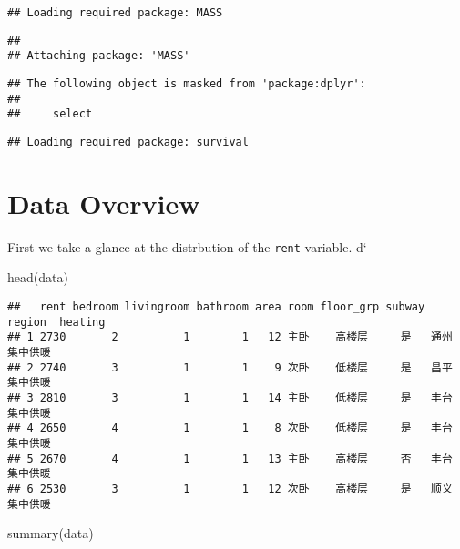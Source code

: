 \documentclass[
]{article}
\newenvironment{Shaded}{\begin{snugshade}}{\end{snugshade}}
\newcommand{\FunctionTok}[1]{\textcolor[rgb]{0.00,0.00,0.00}{#1}}
\newcommand{\NormalTok}[1]{#1}
\begin{document}
\begin{verbatim}
## Loading required package: MASS
\end{verbatim}

\begin{verbatim}
## 
## Attaching package: 'MASS'
\end{verbatim}

\begin{verbatim}
## The following object is masked from 'package:dplyr':
## 
##     select
\end{verbatim}

\begin{verbatim}
## Loading required package: survival
\end{verbatim}

\hypertarget{data-overview}{%
\section{Data Overview}\label{data-overview}}

First we take a glance at the distrbution of the \texttt{rent} variable.
d`

\begin{Shaded}
\begin{Highlighting}[]
\FunctionTok{head}\NormalTok{(data)}
\end{Highlighting}
\end{Shaded}

\begin{verbatim}
##   rent bedroom livingroom bathroom area room floor_grp subway region  heating
## 1 2730       2          1        1   12 主卧    高楼层     是   通州 集中供暖
## 2 2740       3          1        1    9 次卧    低楼层     是   昌平 集中供暖
## 3 2810       3          1        1   14 主卧    低楼层     是   丰台 集中供暖
## 4 2650       4          1        1    8 次卧    低楼层     是   丰台 集中供暖
## 5 2670       4          1        1   13 主卧    高楼层     否   丰台 集中供暖
## 6 2530       3          1        1   12 次卧    高楼层     是   顺义 集中供暖
\end{verbatim}

\begin{Shaded}
\begin{Highlighting}[]
\FunctionTok{summary}\NormalTok{(data)}
\end{Highlighting}
\end{Shaded}
\end{document}
